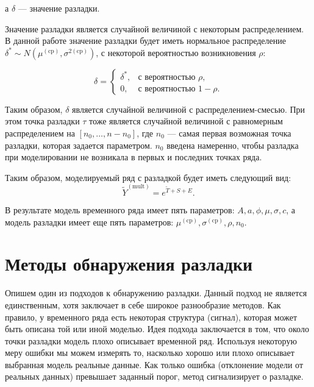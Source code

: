 \documentclass[%
12pt,
master,  %
natbib,      %
subf,        %
substylefile = spbu.rtx,
href,        %
colorlinks,  %
]{disser}
\begin{document}
а $ \delta $  --- значение разладки.

Значение разладки является случайной величиной с некоторым распределением. В данной работе значение разладки будет иметь нормальное распределение $ \delta^* \sim N(\mu^{\mathrm{(cp)}}, \sigma^{2\mathrm{(cp)}})  $, с некоторой вероятностью возникновения $ \rho $:

\begin{equation*}
\delta = \begin{cases}
    		\delta^*, & \textrm{с вероятностью } \rho, \\
  		0, & \textrm{с вероятностью } 1 - \rho.
	\end{cases} 
\end{equation*}

Таким образом, $\delta$ является случайной величиной с распределением-смесью. При этом точка разладки  $\tau$ тоже является случайной величиной с равномерным распределением на $ [n_0, \dots, n - n_0 ] $, где $ n_0 $ --- самая первая возможная точка разладки, которая задается параметром. $n_0$ введена намеренно, чтобы разладка при моделировании не возникала в первых и последних точках ряда.

Таким образом, моделируемый ряд с разладкой будет иметь следующий вид:
\begin{equation*}
\tilde{Y}^{\mathrm{(mult)}} = e^{\tilde{T} + S + E}. 
\end{equation*}

В результате модель временного ряда имеет пять параметров: $ A, a, \phi, \mu, \sigma, c $, а модель разладки имеет еще пять параметров: $ \mu^{\mathrm{(cp)}}, \sigma^{\mathrm{(cp)}}, \rho, n_0 $.

\section{Методы обнаружения разладки}


Опишем один из подходов к обнаружению разладки. Данный подход не является единственным, хотя заключает в себе широкое разнообразие методов. Как правило, у временного ряда есть некоторая структура (сигнал), которая может быть описана той или иной моделью. Идея подхода заключается в том, что около точки разладки модель плохо описывает временной ряд. Используя некоторую меру ошибки мы можем измерять то, насколько хорошо или плохо описывает выбранная модель реальные данные. Как только ошибка (отклонение модели от реальных данных) превышает заданный порог, метод сигнализирует о разладке.
\end{document}
